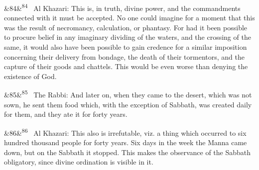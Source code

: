 \documentclass[12pt]{article}
\newcommand{\para}[1][]{\par\noindent\ifx&#1&\else\textsuperscript{\footnotesize #1}~\fi}
\begin{document}
\para[84] Al Khazari: This is, in truth, divine power, and the commandments connected with it must be accepted. No one could imagine for a moment that this was the result of necromancy, calculation, or phantasy. For had it been possible to procure belief in any imaginary dividing of the waters, and the crossing of the same, it would also have been possible to gain credence for a similar imposition concerning their delivery from bondage, the death of their tormentors, and the capture of their goods and chattels. This would be even worse than denying the existence of God.

\para[85] The Rabbi: And later on, when they came to the desert, which was not sown, he sent them food which, with the exception of Sabbath, was created daily for them, and they ate it for forty years.

\para[86] Al Khazari: This also is irrefutable, viz. a thing which occurred to six hundred thousand people for forty years. Six days in the week the Manna came down, but on the Sabbath it stopped. This makes the observance of the Sabbath obligatory, since divine ordination is visible in it.
\end{document}
